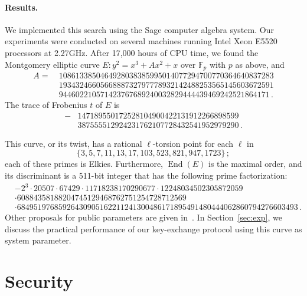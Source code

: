 \documentclass{llncs}
\newcommand{\F}{\mathbb{F}}
\DeclareMathOperator{\End}{End}
\begin{document}
\paragraph{Results.}
We implemented this search using the Sage computer algebra system.
Our experiments were conducted on several machines running
Intel Xeon E5520 processors at 2.27GHz. %
After 17,000 hours of CPU time, we found the Montgomery elliptic curve 
$
	E : y^2 = x^3 + A x^2 + x
$
over $\F_p$ with $p$ as above, and
\[
\begin{aligned}
A =\ 
& 1086133850464928038385995014077294700770364640837283 \\
& 1934324660566888732797778932142488253565145603672591 \\
& 944602210571423767689240032829444439469242521864171\,.
\end{aligned}
\]
The trace of Frobenius $t$ of $E$ is
\[
\begin{aligned}
-&147189550172528104900422131912266898599 \\
&387555512924231762107728432541952979290\,.
\end{aligned}
\]

This curve, or its twist, has a rational $\ell$-torsion point 
for each $\ell$ in
\[
  \{3, 5, 7, 11, 13, 17, 103, 523, 821, 947, 1723\}
  \,;
\]
each of these primes is Elkies.
Furthermore, $\End(E)$ is the maximal order, and its discriminant is
a 511-bit integer that has the following prime factorization:
\[
\begin{aligned}
& \scriptstyle -2^3 \cdot 20507 \cdot 67429 \cdot 11718238170290677 \cdot 12248034502305872059 \\
& \scriptstyle \cdot 60884358188204745129468762751254728712569\\
& \scriptstyle \cdot 68495197685926430905162211241300486171895491480444062860794276603493\,.
\end{aligned}
\]
Other proposals for public parameters are given in~\cite{memoire}.
In Section~\ref{sec:exp}, we discuss the practical performance
of our key-exchange protocol using this curve as system parameter.

\section{Security}
\label{sec:sec}
\end{document}
